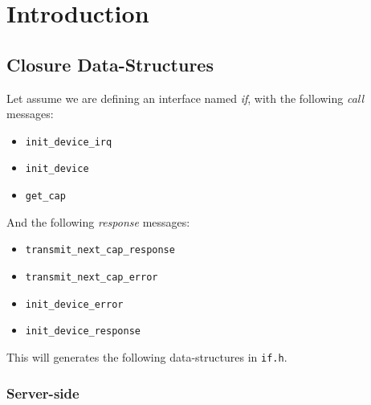 \section{Introduction}

\subsection{Closure Data-Structures}

Let assume we are defining an interface named \emph{if}, with the
following \emph{call} messages:
\begin{itemize}
  \item \verb!init_device_irq!
  \item \verb!init_device!
  \item \verb!get_cap!
\end{itemize}

And the following \emph{response} messages:
\begin{itemize}
  \item \verb!transmit_next_cap_response!
  \item \verb!transmit_next_cap_error!
  \item \verb!init_device_error!
  \item \verb!init_device_response!
\end{itemize}

This will generates the following data-structures in \verb!if.h!. 

\subsubsection{Server-side}

